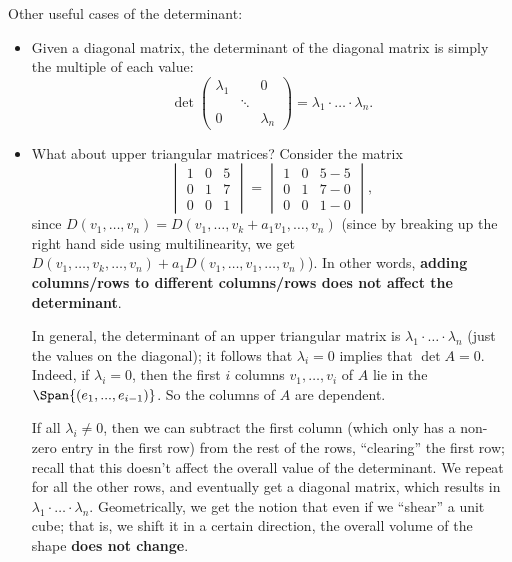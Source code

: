 \documentclass[math0540-lecture-notes.tex]{subfiles}
\begin{document}
Other useful cases of the determinant:
\begin{itemize}
  \item Given a diagonal matrix, the determinant of the diagonal matrix is simply the multiple of
    each value: \[
      \det{\begin{pmatrix} \lambda_1 & & 0 \\ & \ddots & \\ 0 & & \lambda_n \end{pmatrix}
      }=\lambda_1\cdot \ldots\cdot \lambda_n
    .\]
  \item What about upper triangular matrices? Consider the matrix \[
      \begin{vmatrix} 1&0&5\\0&1&7\\0&0&1 \end{vmatrix} =\begin{vmatrix} 1&0&5-5\\0&1&7-0\\0&0&1-0 \end{vmatrix} 
    ,\] since $D(v_1,\ldots,v_n)=D(v_1,\ldots,v_k+a_1v_1,\ldots,v_n)$ (since by breaking up the
    right hand side using multilinearity, we get
    $D(v_1,\ldots,v_k,\ldots,v_n)+a_1D(v_1,\ldots,v_1,\ldots,v_n)$). In other words, \textbf{adding
    columns/rows to different columns/rows does not affect the determinant}.

    In general, the determinant of an upper triangular matrix is \textbf{$\lambda_1\cdot \ldots\cdot
    \lambda_n$} (just the values on the diagonal); it follows that $\lambda_i=0$ implies that
    $\det{A}=0$. Indeed, if $\lambda_i=0$, then the first $i$ columns $v_1,\ldots,v_{i}$ of $A$ lie
    in the $\Span{(e_1,...,e_{i-1})}$. So the columns of $A$ are dependent.

    If all $\lambda_i\neq 0$, then we can subtract the first column (which only has a non-zero entry
    in the first row) from the rest of the rows, ``clearing'' the first row; recall that this
    doesn't affect the overall value of the determinant. We repeat for all the other rows, and
    eventually get a diagonal matrix, which results in $\lambda_1\cdot \ldots\cdot \lambda_n$.
    Geometrically, we get the notion that even if we ``shear'' a unit cube; that is, we shift it in
    a certain direction, the overall volume of the shape \textbf{does not change}.
\end{itemize}















 
\end{document}
